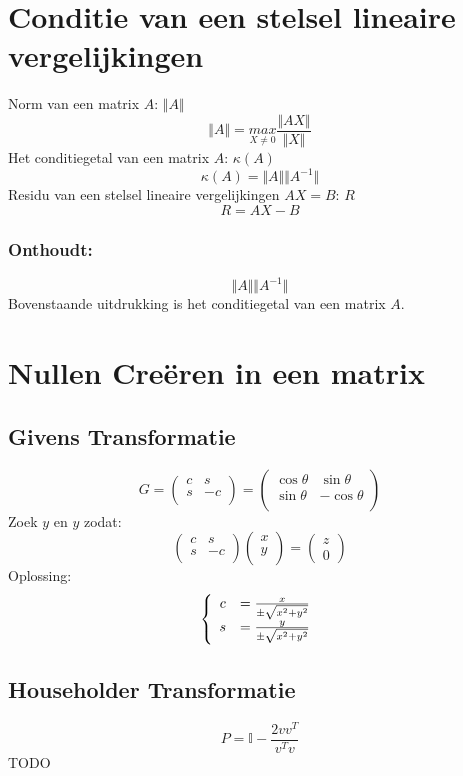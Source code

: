 \documentclass[samenvatting.tex]{subfiles}
\begin{document}
\section{Conditie van een stelsel lineaire vergelijkingen}
Norm van een matrix $A$: $\Vert A \Vert$
\[
\Vert A \Vert = \underset{X \neq 0}{max}\frac{\Vert AX \Vert}{\Vert X \Vert}
\]
Het conditiegetal van een matrix $A$: $\kappa(A)$
\[
\kappa(A) = \Vert A \Vert \Vert A^{-1} \Vert
\]
Residu van een stelsel lineaire vergelijkingen $AX=B$: $R$
\[
R = AX - B
\]

\subsubsection*{Onthoudt:}
\[
\Vert A\Vert\Vert A^{-1}\Vert
\]
Bovenstaande uitdrukking is het conditiegetal van een matrix $A$.

\section{Nullen Cre\"eren in een matrix}
\subsection{Givens Transformatie}
\[
G = 
\begin{pmatrix}
c & s\\
s & -c\\
\end{pmatrix}
=
\begin{pmatrix}
\cos\theta & \sin\theta\\
\sin\theta & -\cos\theta\\
\end{pmatrix}
\]
Zoek $y$ en $y$ zodat:
\[
\begin{pmatrix}
c & s\\
s & -c\\
\end{pmatrix}
\begin{pmatrix}
x\\y\\
\end{pmatrix}
=
\begin{pmatrix}
z\\0
\end{pmatrix}
\]
Oplossing:
\[
\left\{
\begin{array}{c c}
c &= \frac{x}{\pm \sqrt{x^2+y^2}}\\
s &= \frac{y}{\pm \sqrt{x^2+y^2}}\\
\end{array}
\right.
\]

\subsection{Householder Transformatie}
\[
P =\mathbb{I} - \frac{2vv^T}{v^Tv}
\]
TODO
\end{document}
